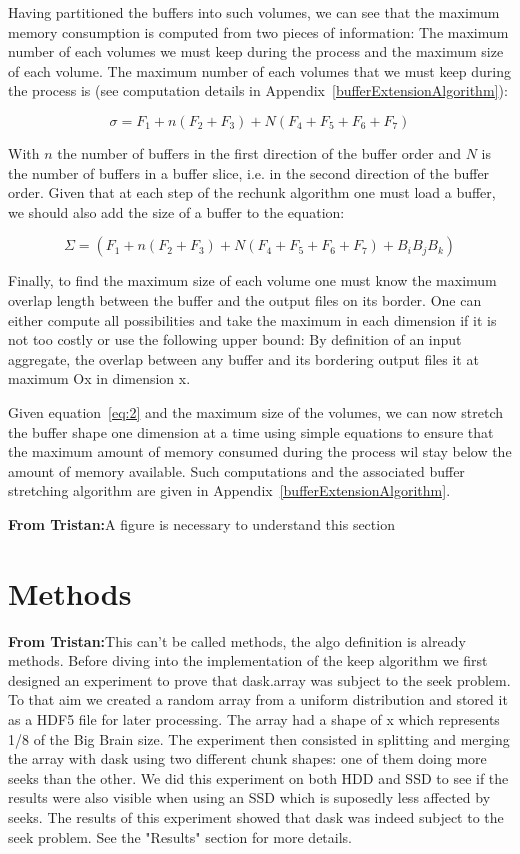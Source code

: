 \documentclass[conference]{IEEEtran}
\newcommand{\tristan}[1]{\color{orange}\textbf{From Tristan:}#1\color{black}}
\begin{document}
Having partitioned the buffers into such volumes, we can see that the maximum
memory consumption is computed from two pieces of information: The maximum number
of each volumes we must keep during the process and the maximum size of each
volume. The maximum number of each volumes that we must keep during the process
is (see computation details in Appendix~\ref{bufferExtensionAlgorithm}):

\begin{equation} \label{eq:2}
\sigma = F_1 + n(F_2 + F_3) + N(F_4 + F_5 + F_6 + F_7)
\end{equation}

With $n$ the number of buffers in the first direction of the buffer order and
$N$ is the number of buffers in a buffer slice, i.e. in the second direction of
the buffer order. Given that at each step of the rechunk algorithm one must
load a buffer, we should also add the size of a buffer to the equation:

\begin{equation} \label{eq:3}
\Sigma = (F_1 + n(F_2 + F_3) + N(F_4 + F_5 + F_6 + F_7) + B_iB_jB_k)
\end{equation}

Finally, to find the maximum size of each volume one must know the maximum
overlap length between the buffer and the output files on its border. One can
either compute all possibilities and take the maximum in each dimension if it is
not too costly or use the following upper bound: By definition of an input
aggregate, the overlap between any buffer and its bordering output files it at
maximum Ox in dimension x.

Given equation~\ref{eq:2} and the maximum size of the volumes, we can now
stretch the buffer shape one dimension at a time using simple equations to ensure
that the maximum amount of memory consumed during the process wil stay below the
amount of memory available. Such computations and the associated buffer stretching
algorithm are given in Appendix~\ref{bufferExtensionAlgorithm}.

\tristan{A figure is necessary to understand this section}

\section{Methods}
\tristan{This can't be called methods, the algo definition is already methods.}
Before diving into the implementation of the keep algorithm we first designed
an experiment to prove that dask.array was subject to the seek problem. To that
aim we created a random array from a uniform distribution and stored it as a
HDF5 file for later processing. The array had a shape of x which represents 1/8
of the Big Brain size. The experiment then consisted in splitting and merging
the array with dask using two different chunk shapes: one of them doing more
seeks than the other. We did this experiment on both HDD and SSD to see if the
results were also visible when using an SSD which is suposedly less affected by
seeks. The results of this experiment showed that dask was indeed subject to the
seek problem. See the "Results" section for more details.
\end{document}
